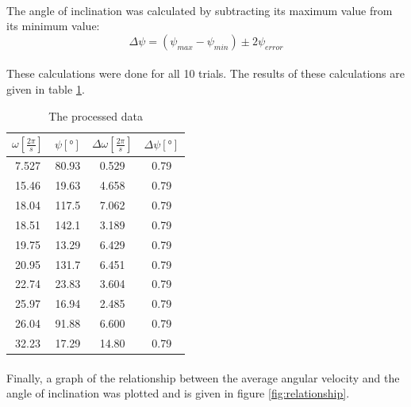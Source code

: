 \documentclass[a4paper]{article}
\begin{document}
\paragraph*{}
The angle of inclination was calculated by subtracting its maximum value from
its minimum value:
$$\Delta \psi = (\psi_{max} - \psi_{min}) \pm 2 \psi_{error}$$

\paragraph*{}
These calculations were done for all 10 trials. The results of these
calculations are given in table \ref{tbl:processed-data}.

\begin{table}[h!]
  \centering
  \begin{tabular}{c|c|c|c}
    $\omega \left[ \si{\frac{2 \pi}{s}} \right]$ & 
    $\psi \left[ \si{\degree} \right]$ & 
    $\Delta \omega \left[ \si{\frac{2 \pi}{s}} \right]$ & 
    $\Delta \psi \left[ \si{\degree} \right]$ \\ \hline \hline
    7.527 & 80.93 & 0.529 & 0.79 \\ \hline
    15.46 & 19.63 & 4.658 & 0.79 \\ \hline
    18.04 & 117.5 & 7.062 & 0.79 \\ \hline
    18.51 & 142.1 & 3.189 & 0.79 \\ \hline
    19.75 & 13.29 & 6.429 & 0.79 \\ \hline
    20.95 & 131.7 & 6.451 & 0.79 \\ \hline
    22.74 & 23.83 & 3.604 & 0.79 \\ \hline
    25.97 & 16.94 & 2.485 & 0.79 \\ \hline
    26.04 & 91.88 & 6.600 & 0.79 \\ \hline
    32.23 & 17.29 & 14.80 & 0.79 \\ \hline
  \end{tabular}
  \caption{The processed data}
  \label{tbl:processed-data}
\end{table}

\paragraph*{} Finally, a graph of the relationship between the average angular
velocity and the angle of inclination was plotted and is given in figure
\ref{fig:relationship}.
\end{document}
